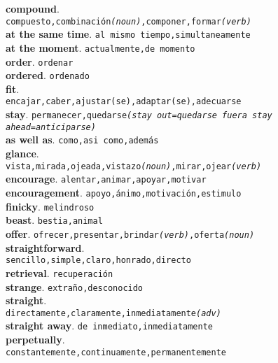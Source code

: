 \documentclass[twocolumn]{article}
\begin{document}
	\textsf{\textbf{compound}}.\\
        \texttt{compuesto,combinaci\'on{\scriptsize \textsl{(noun)}},componer,formar{\scriptsize \textsl{(verb)}}}\\
	\textsf{\textbf{at the same time}}. \texttt{al mismo tiempo,simultaneamente}\\
	\textsf{\textbf{at the moment}}. \texttt{actualmente,de momento}\\
	\textsf{\textbf{order}}. \texttt{ordenar}\\
	\textsf{\textbf{ordered}}. \texttt{ordenado}\\
	\textsf{\textbf{fit}}.\\ \texttt{encajar,caber,ajustar(se),adaptar(se),adecuarse}\\
	\textsf{\textbf{stay}}. \texttt{permanecer,quedarse{\scriptsize \textsl{(stay out=quedarse fuera stay ahead=anticiparse)}}}\\
	\textsf{\textbf{as well as}}. \texttt{como,asi como,adem\'as}\\
	\textsf{\textbf{glance}}.\\ \texttt{vista,mirada,ojeada,vistazo{\scriptsize \textsl{(noun)}},mirar,ojear{\scriptsize \textsl{(verb)}}}\\
	\textsf{\textbf{encourage}}. \texttt{alentar,animar,apoyar,motivar}\\
	\textsf{\textbf{encouragement}}. \texttt{apoyo,\'animo,motivaci\'on,estimulo}\\
	\textsf{\textbf{finicky}}. \texttt{melindroso}\\
	\textsf{\textbf{beast}}. \texttt{bestia,animal}\\
	\textsf{\textbf{offer}}. \texttt{ofrecer,presentar,brindar{\scriptsize \textsl{(verb)}},oferta{\scriptsize \textsl{(noun)}}}\\
	\textsf{\textbf{straightforward}}.\\ \texttt{sencillo,simple,claro,honrado,directo}\\
	\textsf{\textbf{retrieval}}. \texttt{recuperaci\'on}\\
	\textsf{\textbf{strange}}. \texttt{extra\~no,desconocido}\\
	\textsf{\textbf{straight}}.\\ \texttt{directamente,claramente,inmediatamente{\scriptsize \textsl{(adv)}}}\\
	\textsf{\textbf{straight away}}. \texttt{de inmediato,inmediatamente}\\
	\textsf{\textbf{perpetually}}.\\ \texttt{constantemente,continuamente,permanentemente}\\
\end{document}
